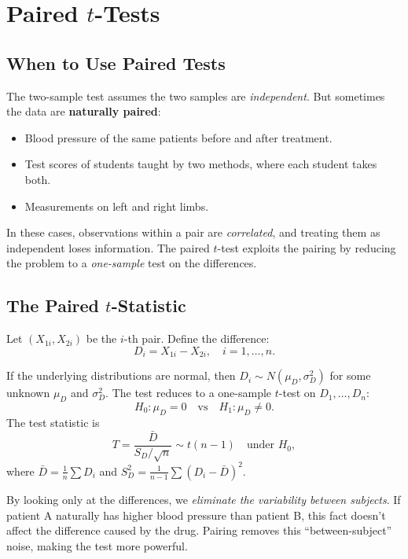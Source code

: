 \documentclass[12pt, a4paper, oneside]{book}
\theoremstyle{definition}
\theoremstyle{plain}
\theoremstyle{remark}
\begin{document}
\section{Paired $t$-Tests}
\label{sec:paired}

\subsection{When to Use Paired Tests}

The two-sample test assumes the two samples are \emph{independent}.  But
sometimes the data are \textbf{naturally paired}:
\begin{itemize}
  \item Blood pressure of the same patients before and after treatment.
  \item Test scores of students taught by two methods, where each student
        takes both.
  \item Measurements on left and right limbs.
\end{itemize}

In these cases, observations within a pair are \emph{correlated}, and
treating them as independent loses information.  The paired $t$-test exploits
the pairing by reducing the problem to a \emph{one-sample} test on the
differences.

\subsection{The Paired $t$-Statistic}

Let $(X_{1i}, X_{2i})$ be the $i$-th pair.  Define the difference:
\[
  D_i = X_{1i} - X_{2i}, \quad i=1,\ldots,n.
\]

If the underlying distributions are normal, then $D_i\sim N(\mu_D,\sigma_D^2)$
for some unknown $\mu_D$ and $\sigma_D^2$.  The test reduces to a one-sample
$t$-test on $D_1,\ldots,D_n$:
\[
  H_0: \mu_D = 0 \quad \text{vs} \quad H_1: \mu_D \ne 0.
\]
The test statistic is
\[
  T = \frac{\bar{D}}{S_D/\sqrt{n}} \sim t(n-1) \quad \text{under } H_0,
\]
where $\bar{D} = \frac{1}{n}\sum D_i$ and
$S_D^2 = \frac{1}{n-1}\sum(D_i-\bar{D})^2$.

\begin{intuition}
By looking only at the differences, we \emph{eliminate the variability
between subjects}.  If patient A naturally has higher blood pressure than
patient B, this fact doesn't affect the difference caused by the drug.
Pairing removes this ``between-subject'' noise, making the test more
powerful.
\end{intuition}
\end{document}
